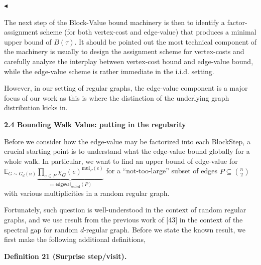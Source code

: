 $\blacktriangleleft$\par




The next step of the Block-Value bound machinery is then to identify a factor-assignment scheme (for both vertex-cost and edge-value) that produces a minimal upper bound of $B(\tau)$. It should be pointed out the most technical component of the machinery is usually to design the assignment scheme for vertex-costs
and carefully analyze the interplay between vertex-cost bound and edge-value bound,
while the edge-value scheme is rather immediate in the i.i.d. setting.\par




However, in our setting of regular graphs, the edge-value component is a major focus of our work as this is where the distinction of the underlying graph distribution kicks in.\par







\par\medskip\noindent\textbf{
2.4 Bounding Walk Value: putting in the regularity}\par




Before we consider how the edge-value may be factorized into each BlockStep, a crucial starting point is to understand what the edge-value bound globally for a whole walk. In particular, we want to find an upper bound of edge-value for $\mathbb{E}_{G\sim G_{d}(n)}\underbrace{\prod_{e\in P}\chi_{G}(e)^{\text{mul}_{P}(e)}}_{\coloneqq\mathsf{edgeval}_{\text{scaled}}(P)}$ for a “not-too-large” subset of edges $P\subseteq\binom{n}{2}$ with various multiplicities in a random regular graph.\par




Fortunately, such question is well-understood in the context of random regular graphs, and
we use result from the previous work of [43] in the context of the spectral gap for random $d$-regular graph. Before we state the known result, we first make the following additional definitions,\par





\par\medskip\noindent\textbf{
\textbf{Definition 21}\textbf{ }(Surprise step/visit)\textbf{.}
}\par



